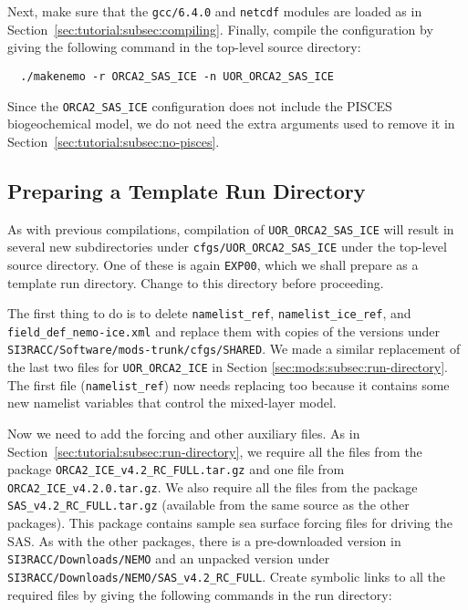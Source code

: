 Next, make sure that the \verb|gcc/6.4.0| and \verb|netcdf| modules are loaded as in Section~\ref{sec:tutorial:subsec:compiling}.
Finally, compile the configuration by giving the following command in the top-level source directory:

\begin{verbatim}
  ./makenemo -r ORCA2_SAS_ICE -n UOR_ORCA2_SAS_ICE
\end{verbatim}

\noindent{}Since the \verb|ORCA2_SAS_ICE| configuration does not include the PISCES biogeochemical model, we do not need the extra arguments used to remove it in Section~\ref{sec:tutorial:subsec:no-pisces}.


\subsection{Preparing a Template Run Directory}
\label{sec:sas:subsec:run-directory}

As with previous compilations, compilation of \verb|UOR_ORCA2_SAS_ICE| will result in several new subdirectories under \verb|cfgs/UOR_ORCA2_SAS_ICE| under the top-level source directory.
One of these is again \verb|EXP00|, which we shall prepare as a template run directory.
Change to this directory before proceeding.

The first thing to do is to delete \verb|namelist_ref|, \verb|namelist_ice_ref|, and \verb|field_def_nemo-ice.xml| and replace them with copies of the versions under \verb|SI3RACC/Software/mods-trunk/cfgs/SHARED|.
We made a similar replacement of the last two files for \verb|UOR_ORCA2_ICE| in Section \ref{sec:mods:subsec:run-directory}.
The first file (\verb|namelist_ref|) now needs replacing too because it contains some new namelist variables that control the mixed-layer model.

Now we need to add the forcing and other auxiliary files.
As in Section~\ref{sec:tutorial:subsec:run-directory}, we require all the files from the package \verb|ORCA2_ICE_v4.2_RC_FULL.tar.gz| and one file from \verb|ORCA2_ICE_v4.2.0.tar.gz|.
We also require all the files from the package \verb|SAS_v4.2_RC_FULL.tar.gz| (available from the same source as the other packages).
This package contains sample sea surface forcing files for driving the SAS.
As with the other packages, there is a pre-downloaded version in \verb|SI3RACC/Downloads/NEMO| and an unpacked version under \verb|SI3RACC/Downloads|\newline\verb|/NEMO/SAS_v4.2_RC_FULL|.
Create symbolic links to all the required files by giving the following commands in the run directory:


